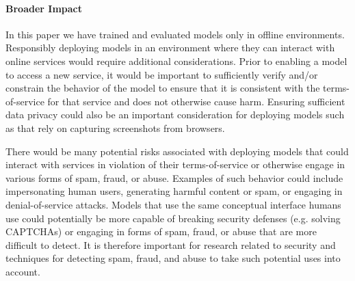\paragraph{Broader Impact}

In this paper we have trained and evaluated models only in offline environments. Responsibly deploying models in an environment where they can interact with online services would require additional considerations. Prior to enabling a model to access a new service, it would be important to sufficiently verify and/or constrain the behavior of the model to ensure that it is consistent with the terms-of-service for that service and does not otherwise cause harm. Ensuring sufficient data privacy could also be an important consideration for deploying models such as \ours that rely on capturing screenshots from browsers.

There would be many potential risks associated with deploying models that could interact with services in violation of their terms-of-service or otherwise engage in various forms of spam, fraud, or abuse. Examples of such behavior could include impersonating human users, generating harmful content or spam, or engaging in denial-of-service attacks. Models that use the same conceptual interface humans use could potentially be more capable of breaking security defenses (e.g. solving CAPTCHAs) or engaging in forms of spam, fraud, or abuse that are more difficult to detect. It is therefore important for research related to security and techniques for detecting spam, fraud, and abuse to take such potential uses into account. 
